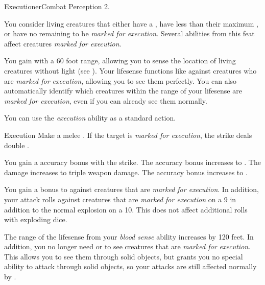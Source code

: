     \begin{feat}{Executioner}{Combat}
        \featpres Perception 2.

         You consider living creatures that either have a , have less than their maximum , or have no remaining  to be \textit{marked for execution}.
        Several abilities from this feat affect creatures \textit{marked for execution}.

         You gain  with a 60 foot range, allowing you to sense the location of living creatures without light (see ).
        Your lifesense functions like  against creatures who are \textit{marked for execution}, allowing you to see them perfectly.
        You can also automatically identify which creatures within the range of your lifesense are \textit{marked for execution}, even if you can already see them normally.

         You can use the \textit{execution} ability as a standard action.
        \begin{activeability}{Execution}
            \rankline
            Make a melee .
            If the target is \textit{marked for execution}, the strike deals double .

            \rankline
             You gain a  accuracy bonus with the strike.
             The accuracy bonus increases to .
             The damage increases to triple weapon damage.
             The accuracy bonus increases to .
        \end{activeability}

         You gain a  bonus to  against creatures that are \textit{marked for execution}.
        In addition, your attack rolls against creatures that are \textit{marked for execution}  on a 9 in addition to the normal explosion on a 10.
        This does not affect additional rolls with exploding dice.

         The range of the lifesense from your \textit{blood sense} ability increases by 120 feet.
        In addition, you no longer need  or  to see creatures that are \textit{marked for execution}.
        This allows you to see them through solid objects, but grants you no special ability to attack through solid objects, so your attacks are still affected normally by .
    \end{feat}

